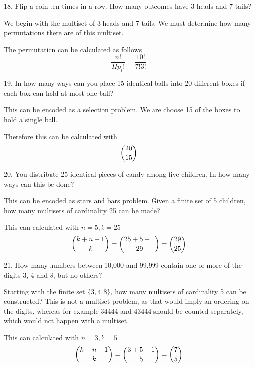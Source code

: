 \documentclass{hippoidC}
\begin{document}
\begin{prooflist}{18. Flip a coin ten times in a row. How many outcomes have 3 heads and 7 tails?}
\item We begin with the multiset of 3 heads and 7 tails. We must determine how
    many permutations there are of this multiset.
\item The permutation can be calculated as follows
    $$ \dfrac{n!}{\Pi{p_i}!} = \dfrac{10!}{7!3!}$$
\end{prooflist}

\begin{prooflist}{19. In how many ways can you place 15 identical balls into 20
    different boxes if each box can hold at most one ball?}
\item This can be encoded as a selection problem. We are choose 15 of the boxes
    to hold a single ball.
\item Therefore this can be calculated with
    $$ \dbinom{20}{15}$$
\end{prooflist}

\begin{prooflist}{20. You distribute 25 identical pieces of candy among five children. In how many ways can this be done?}
\item This can be encoded as stars and bars problem. Given a finite set of 5
    children, how many multisets of cardinality 25 can be made?
\item This can calculated with $n=5, k=25$
    $$ \dbinom{k+n-1}{k} = \dbinom{25+5-1}{29}=\dbinom{29}{25}$$
\end{prooflist}

\begin{prooflist}{21. How many numbers between 10,000 and 99,999 contain one or more of the digits 3, 4 and 8, but no others?}
\item Starting with the finite set $\{3, 4, 8\}$, how many multisets of
    cardinality 5 can be constructed? This is not a multiset problem, as that
    would imply an ordering on the digits, whereas for example 34444 and 43444
    should be counted separately, which would not happen with a multiset.
\item This can calculated with $n=3, k=5$
    $$ \dbinom{k+n-1}{k} = \dbinom{3+5-1}{5}=\dbinom{7}{5}$$
\end{prooflist}
\end{document}
